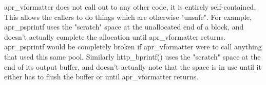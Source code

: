 \begin{DoxyPre}apr\_vformatter does not call out to any other code, it is entirely
self-contained.  This allows the callers to do things which are
otherwise "unsafe".  For example, apr\_psprintf uses the "scratch"
space at the unallocated end of a block, and doesn't actually
complete the allocation until apr\_vformatter returns.  apr\_psprintf
would be completely broken if apr\_vformatter were to call anything
that used this same pool.  Similarly http\_bprintf() uses the "scratch"
space at the end of its output buffer, and doesn't actually note
that the space is in use until it either has to flush the buffer
or until apr\_vformatter returns.
\end{DoxyPre}
 